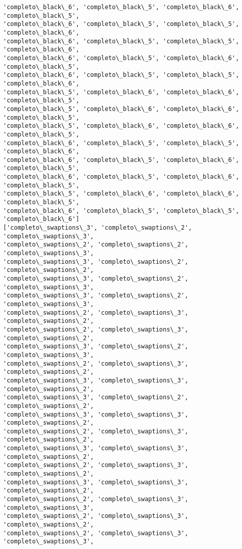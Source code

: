 \documentclass[11pt]{article}
\begin{document}
\begin{Verbatim}[commandchars=\\\{\}]
'completo\_black\_6', 'completo\_black\_5', 'completo\_black\_6', 'completo\_black\_5',
'completo\_black\_6', 'completo\_black\_5', 'completo\_black\_5', 'completo\_black\_6',
'completo\_black\_6', 'completo\_black\_5', 'completo\_black\_5', 'completo\_black\_6',
'completo\_black\_6', 'completo\_black\_5', 'completo\_black\_6', 'completo\_black\_5',
'completo\_black\_6', 'completo\_black\_5', 'completo\_black\_5', 'completo\_black\_6',
'completo\_black\_5', 'completo\_black\_6', 'completo\_black\_6', 'completo\_black\_5',
'completo\_black\_5', 'completo\_black\_6', 'completo\_black\_6', 'completo\_black\_5',
'completo\_black\_5', 'completo\_black\_6', 'completo\_black\_6', 'completo\_black\_5',
'completo\_black\_6', 'completo\_black\_5', 'completo\_black\_5', 'completo\_black\_6',
'completo\_black\_6', 'completo\_black\_5', 'completo\_black\_6', 'completo\_black\_5',
'completo\_black\_6', 'completo\_black\_5', 'completo\_black\_6', 'completo\_black\_5',
'completo\_black\_5', 'completo\_black\_6', 'completo\_black\_6', 'completo\_black\_5',
'completo\_black\_6', 'completo\_black\_5', 'completo\_black\_5', 'completo\_black\_6']
['completo\_swaptions\_3', 'completo\_swaptions\_2', 'completo\_swaptions\_3',
'completo\_swaptions\_2', 'completo\_swaptions\_2', 'completo\_swaptions\_3',
'completo\_swaptions\_3', 'completo\_swaptions\_2', 'completo\_swaptions\_2',
'completo\_swaptions\_3', 'completo\_swaptions\_2', 'completo\_swaptions\_3',
'completo\_swaptions\_3', 'completo\_swaptions\_2', 'completo\_swaptions\_3',
'completo\_swaptions\_2', 'completo\_swaptions\_3', 'completo\_swaptions\_2',
'completo\_swaptions\_2', 'completo\_swaptions\_3', 'completo\_swaptions\_2',
'completo\_swaptions\_3', 'completo\_swaptions\_2', 'completo\_swaptions\_3',
'completo\_swaptions\_2', 'completo\_swaptions\_3', 'completo\_swaptions\_2',
'completo\_swaptions\_3', 'completo\_swaptions\_3', 'completo\_swaptions\_2',
'completo\_swaptions\_3', 'completo\_swaptions\_2', 'completo\_swaptions\_2',
'completo\_swaptions\_3', 'completo\_swaptions\_3', 'completo\_swaptions\_2',
'completo\_swaptions\_2', 'completo\_swaptions\_3', 'completo\_swaptions\_2',
'completo\_swaptions\_3', 'completo\_swaptions\_3', 'completo\_swaptions\_2',
'completo\_swaptions\_2', 'completo\_swaptions\_3', 'completo\_swaptions\_2',
'completo\_swaptions\_3', 'completo\_swaptions\_3', 'completo\_swaptions\_2',
'completo\_swaptions\_2', 'completo\_swaptions\_3', 'completo\_swaptions\_3',
'completo\_swaptions\_2', 'completo\_swaptions\_3', 'completo\_swaptions\_2',
'completo\_swaptions\_2', 'completo\_swaptions\_3', 'completo\_swaptions\_3',

\end{Verbatim}
\end{document}
